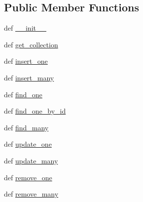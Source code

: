 \subsection*{Public Member Functions}
\begin{DoxyCompactItemize}
\item 
def \hyperlink{classNEAT__PyGenetics_1_1NEAT_1_1Repository_1_1DatabaseConnector_1_1DatabaseConnector_a57537c32ba05cb1800b4966a9b5ff97f}{\+\_\+\+\_\+init\+\_\+\+\_\+}
\item 
def \hyperlink{classNEAT__PyGenetics_1_1NEAT_1_1Repository_1_1DatabaseConnector_1_1DatabaseConnector_a0531d203c5909eb70a1f328f1ee87e46}{get\+\_\+collection}
\item 
def \hyperlink{classNEAT__PyGenetics_1_1NEAT_1_1Repository_1_1DatabaseConnector_1_1DatabaseConnector_a1c8d38690f25313e30e339bb449e2afc}{insert\+\_\+one}
\item 
def \hyperlink{classNEAT__PyGenetics_1_1NEAT_1_1Repository_1_1DatabaseConnector_1_1DatabaseConnector_acaa494840a4f5c9ed45efc87a7b3c9e3}{insert\+\_\+many}
\item 
def \hyperlink{classNEAT__PyGenetics_1_1NEAT_1_1Repository_1_1DatabaseConnector_1_1DatabaseConnector_a01ed6b2bbdf7e49c3b12260e8f716df0}{find\+\_\+one}
\item 
def \hyperlink{classNEAT__PyGenetics_1_1NEAT_1_1Repository_1_1DatabaseConnector_1_1DatabaseConnector_ab84e5e82fb7f4ef7e63d1a463f931d0b}{find\+\_\+one\+\_\+by\+\_\+id}
\item 
def \hyperlink{classNEAT__PyGenetics_1_1NEAT_1_1Repository_1_1DatabaseConnector_1_1DatabaseConnector_a4f488daecf67131f0a138fbe02d75ad1}{find\+\_\+many}
\item 
def \hyperlink{classNEAT__PyGenetics_1_1NEAT_1_1Repository_1_1DatabaseConnector_1_1DatabaseConnector_a44ca72a0a552c2c68bb6818e3902548e}{update\+\_\+one}
\item 
def \hyperlink{classNEAT__PyGenetics_1_1NEAT_1_1Repository_1_1DatabaseConnector_1_1DatabaseConnector_a1181a46de443df2c30f65c5585984eab}{update\+\_\+many}
\item 
def \hyperlink{classNEAT__PyGenetics_1_1NEAT_1_1Repository_1_1DatabaseConnector_1_1DatabaseConnector_a562cd964aa44d7e6051d1436acf047ba}{remove\+\_\+one}
\item 
def \hyperlink{classNEAT__PyGenetics_1_1NEAT_1_1Repository_1_1DatabaseConnector_1_1DatabaseConnector_ab576f403333ef9dc793d328bd04c41b6}{remove\+\_\+many}
\end{DoxyCompactItemize}
